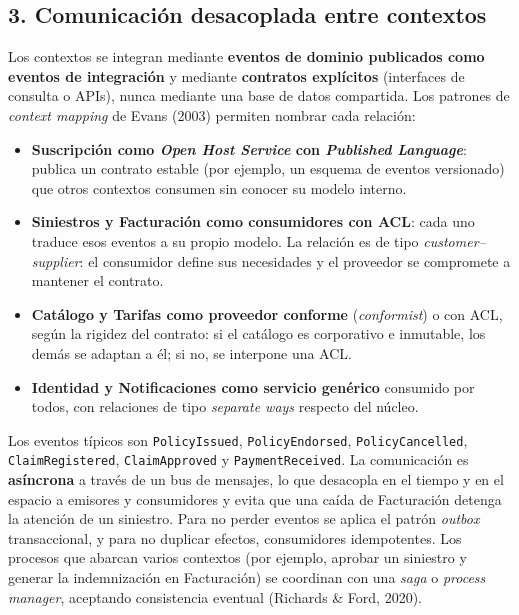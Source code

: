 \documentclass[11pt,a4paper]{article}
\begin{document}
\subsection*{3. Comunicación desacoplada entre contextos}

Los contextos se integran mediante \textbf{eventos de dominio publicados como eventos de
integración} y mediante \textbf{contratos explícitos} (interfaces de consulta o APIs),
nunca mediante una base de datos compartida. Los patrones de \emph{context mapping} de
Evans (2003) permiten nombrar cada relación:

\begin{itemize}[leftmargin=1.4em]
\item \textbf{Suscripción como \emph{Open Host Service} con \emph{Published Language}}: publica
un contrato estable (por ejemplo, un esquema de eventos versionado) que otros contextos
consumen sin conocer su modelo interno.
\item \textbf{Siniestros y Facturación como consumidores con ACL}: cada uno traduce esos
eventos a su propio modelo. La relación es de tipo \emph{customer--supplier}: el
consumidor define sus necesidades y el proveedor se compromete a mantener el contrato.
\item \textbf{Catálogo y Tarifas como proveedor conforme} (\emph{conformist}) o con ACL,
según la rigidez del contrato: si el catálogo es corporativo e inmutable, los demás se
adaptan a él; si no, se interpone una ACL.
\item \textbf{Identidad y Notificaciones como servicio genérico} consumido por todos,
con relaciones de tipo \emph{separate ways} respecto del núcleo.
\end{itemize}

\begin{sloppypar}
Los eventos típicos son \texttt{PolicyIssued}, \texttt{PolicyEndorsed},
\texttt{PolicyCancelled}, \texttt{ClaimRegistered}, \texttt{ClaimApproved} y
\texttt{PaymentReceived}. La comunicación es \textbf{asíncrona} a través de un bus de
mensajes, lo que desacopla en el tiempo y en el espacio a emisores y consumidores y evita
que una caída de Facturación detenga la atención de un siniestro. Para no perder eventos
se aplica el patrón \emph{outbox} transaccional, y para no duplicar efectos, consumidores
idempotentes. Los procesos que abarcan varios contextos (por ejemplo, aprobar un siniestro
y generar la indemnización en Facturación) se coordinan con una \emph{saga} o
\emph{process manager}, aceptando consistencia eventual (Richards \& Ford, 2020).
\end{sloppypar}
\end{document}
